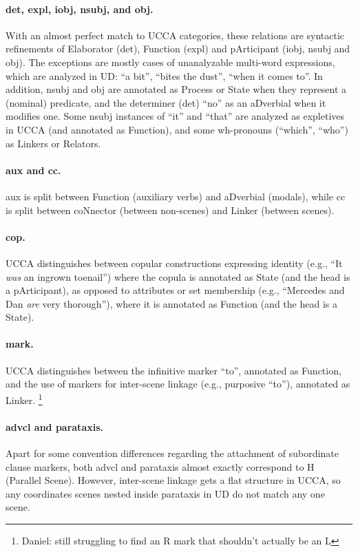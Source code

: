 \documentclass[11pt,a4paper]{article}
\newcommand{\daniel}[1]{\footnote{\color{blue}Daniel: #1}}
\begin{document}
\paragraph{det, expl, iobj, nsubj, and obj.}
With an almost perfect match to UCCA categories,
these relations are syntactic refinements of
Elaborator (det), Function (expl) and pArticipant (iobj, nsubj and obj).
The exceptions are mostly cases of unanalyzable multi-word expressions,
which are analyzed in UD: ``a bit'', ``bites the dust'', ``when it comes to''.
In addition, nsubj and obj are annotated as Process or State when they
represent a (nominal) predicate,
and the determiner (det) ``no'' as an aDverbial when it modifies one.
Some nsubj instances of ``it'' and ``that''
are analyzed as expletives in UCCA (and annotated as Function),
and some wh-pronouns (``which'', ``who'') as Linkers or Relators.

\paragraph{aux and cc.}
aux is split between Function (auxiliary verbs) and aDverbial (modals),
while cc is split between coNnector (between non-scenes) and Linker (between scenes).

\paragraph{cop.}
UCCA distinguishes between copular constructions expressing
identity (e.g., ``It \textit{was} an ingrown toenail'') where the copula is annotated as State
(and the head is a pArticipant),
as opposed to attributes or set membership
(e.g., ``Mercedes and Dan \textit{are} very thorough''), where it is annotated as Function
(and the head is a State).

\paragraph{mark.}
UCCA distinguishes between the infinitive marker ``to'', annotated as Function,
and the use of markers for inter-scene linkage (e.g., purposive ``to''), annotated as Linker.
\daniel{still struggling to find an R mark that shouldn't actually be an L}

\paragraph{advcl and parataxis.}
Apart for some convention differences regarding the attachment of subordinate clause markers,
both advcl and parataxis almost exactly correspond to H (Parallel Scene).
However, inter-scene linkage gets a flat structure in UCCA,
so any coordinates scenes nested inside parataxis in UD do not match any one scene.
\end{document}
